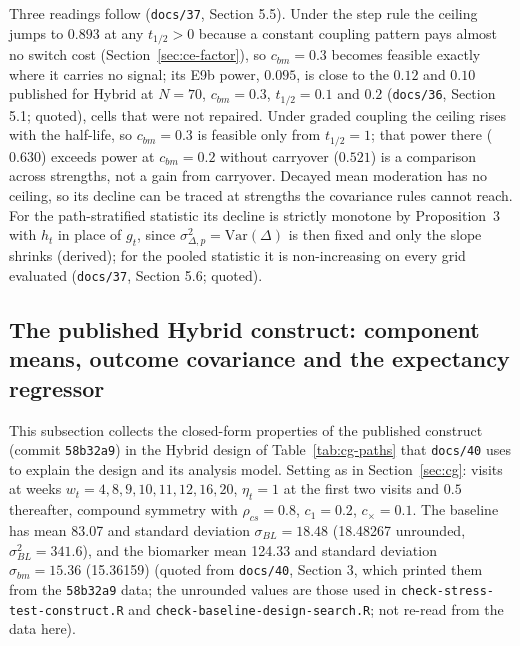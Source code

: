 \documentclass[11pt]{article}
\newcommand{\code}[1]{\texttt{#1}}
\begin{document}
Three readings follow (\code{docs/37}, Section 5.5). Under the step
rule the ceiling jumps to $0.893$ at any $t_{1/2} > 0$ because a
constant coupling pattern pays almost no switch cost
(Section~\ref{sec:ce-factor}), so $c_{bm} = 0.3$ becomes feasible exactly
where it carries no signal; its E9b power, $0.095$, is close to the
$0.12$ and $0.10$ published for Hybrid at $N = 70$, $c_{bm} = 0.3$,
$t_{1/2} = 0.1$ and $0.2$ (\code{docs/36}, Section 5.1; quoted), cells
that were not repaired. Under graded coupling the ceiling rises with
the half-life, so $c_{bm} = 0.3$ is feasible only from $t_{1/2} = 1$;
that power there ($0.630$) exceeds power at $c_{bm} = 0.2$ without
carryover ($0.521$) is a comparison across strengths, not a gain from
carryover. Decayed mean moderation has no ceiling, so its decline can
be traced at strengths the covariance rules cannot reach. For the
path-stratified statistic its decline is strictly monotone by
Proposition~3 with $h_t$ in place of $g_t$, since $\sigma_{\Delta,p}^2 =
\mathrm{Var}(\Delta)$ is then fixed and only the slope shrinks
(derived); for the pooled statistic it is non-increasing on every grid
evaluated (\code{docs/37}, Section 5.6; quoted).

\subsection{The published Hybrid construct: component means, outcome
covariance and the expectancy regressor}
\label{sec:invc-hybrid-construct}

This subsection collects the closed-form properties of the published
construct (commit \code{58b32a9}) in the Hybrid design of
Table~\ref{tab:cg-paths} that \code{docs/40} uses to explain the
design and its analysis model. Setting as in Section~\ref{sec:cg}:
visits at weeks $w_t = 4, 8, 9, 10, 11, 12, 16, 20$, $\eta_t = 1$ at
the first two visits and $0.5$ thereafter, compound symmetry with
$\rho_{cs} = 0.8$, $c_1 = 0.2$, $c_\times = 0.1$. The baseline has mean
83.07 and standard deviation $\sigma_{BL} = 18.48$ (18.48267 unrounded,
$\sigma_{BL}^2 = 341.6$), and the biomarker mean 124.33 and standard
deviation $\sigma_{bm} = 15.36$ (15.36159) (quoted from \code{docs/40},
Section 3, which printed them from the \code{58b32a9} data; the
unrounded values are those used in \code{check-stress-test-construct.R} and
\code{check-baseline-design-search.R}; not re-read from the data here).
\end{document}
